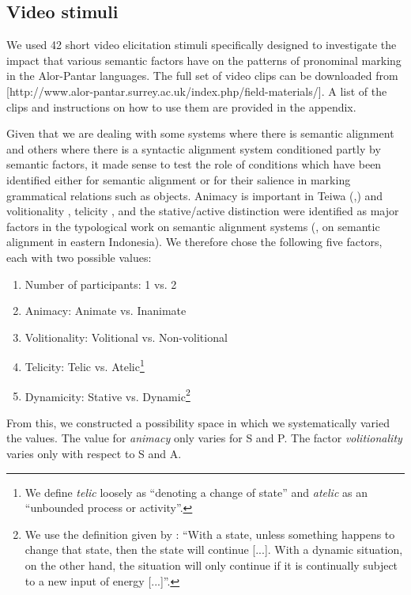 \subsection{Video stimuli} 
\label{sec:10:4.1}
We used 42 short video elicitation stimuli specifically designed to investigate the impact that various semantic factors have on the patterns of pronominal marking in the Alor-Pantar languages. The full set of video clips can be downloaded from [http://www.alor-pantar.surrey.ac.uk/index.php/field-materials/]. A list of the clips and instructions on how to use them are provided in the appendix.

  Given that we are dealing with some systems where there is semantic alignment and others where there is a syntactic alignment system conditioned partly by semantic factors, it made sense to test the role of conditions which have been identified either for semantic alignment or for their salience in marking grammatical relations such as objects. Animacy  is important in Teiwa (\citealt[171]{Klamer2010grammar},\citealt{KlamerEtAl2006}) and volitionality , telicity , and the stative/active distinction were identified as major factors in the typological work on semantic alignment  systems (\citealt{Arkadiev2008}, \citealt{Klamer2008} on semantic alignment in eastern Indonesia). We therefore chose the following five factors, each with two possible values:
  
\begin{enumerate}
\item Number of participants: 1 vs. 2
\item Animacy: Animate vs. Inanimate
\item Volitionality: Volitional vs. Non-volitional
\item Telicity: Telic vs. Atelic\footnote{We define \textit{telic} loosely as ``denoting a change of state'' and \textit{atelic} as an ``unbounded process or activity''.}
\item Dynamicity: Stative vs. Dynamic\footnote{We use the definition given by \citet[49]{Comrie1976}: ``With a state, unless something happens to change that state, then the state will continue [...]. With a dynamic situation, on the other hand, the situation will only continue if it is continually subject to a new input of energy [...]''.}
\end{enumerate}

From this, we constructed a possibility space in which we systematically varied the values. The value for \textit{animacy} only varies for S and P. The factor \textit{volitionality} varies only with respect to S and A. 

